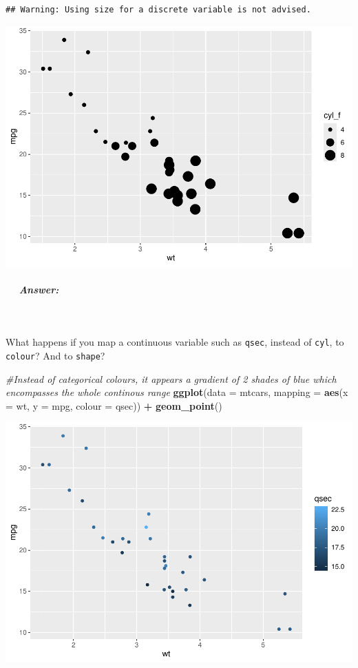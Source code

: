 \documentclass[
]{article}
\newenvironment{Shaded}{\begin{snugshade}}{\end{snugshade}}
\newcommand{\AttributeTok}[1]{\textcolor[rgb]{0.13,0.29,0.53}{#1}}
\newcommand{\CommentTok}[1]{\textcolor[rgb]{0.56,0.35,0.01}{\textit{#1}}}
\newcommand{\FunctionTok}[1]{\textcolor[rgb]{0.13,0.29,0.53}{\textbf{#1}}}
\newcommand{\NormalTok}[1]{#1}
\newcommand{\SpecialCharTok}[1]{\textcolor[rgb]{0.81,0.36,0.00}{\textbf{#1}}}
\begin{document}
\begin{verbatim}
## Warning: Using size for a discrete variable is not advised.
\end{verbatim}

\begin{center}\includegraphics{P1_exercises_files/figure-latex/answer1.1-2} \end{center}

\subparagraph{  Answer:}\label{answer}

 

What happens if you map a continuous variable such as \texttt{qsec},
instead of \texttt{cyl}, to \texttt{colour}? And to \texttt{shape}?

\begin{Shaded}
\begin{Highlighting}[]
\CommentTok{\#Instead of categorical colours, it appears a gradient of 2 shades of blue which encompasses the whole continous range}
\FunctionTok{ggplot}\NormalTok{(}\AttributeTok{data =}\NormalTok{ mtcars, }\AttributeTok{mapping =} \FunctionTok{aes}\NormalTok{(}\AttributeTok{x =}\NormalTok{ wt, }\AttributeTok{y =}\NormalTok{ mpg, }\AttributeTok{colour =}\NormalTok{ qsec)) }\SpecialCharTok{+} 
  \FunctionTok{geom\_point}\NormalTok{()}
\end{Highlighting}
\end{Shaded}

\begin{center}\includegraphics{P1_exercises_files/figure-latex/answer1.2-1} \end{center}
\end{document}
